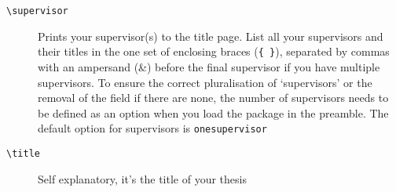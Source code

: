 \documentclass[12pt,oneside]{article}
\newcommand{\oporcom}[1]{\texttt{\color{RoyalBlue}#1}} %
\begin{document}
\begin{description}
    \item[\oporcom{\textbackslash{}supervisor}]
    Prints your supervisor(s) to the title page. List all your supervisors and their titles in the one set of enclosing braces (\texttt{\{ \}}), separated by commas with an ampersand (\&) before the final supervisor if you have multiple supervisors. To ensure the correct pluralisation of `supervisors' or the removal of the field if there are none, the number of supervisors needs to be defined as an option when you load the package in the preamble. The default option for supervisors is \oporcom{onesupervisor}
    
    \item[\oporcom{\textbackslash{}title}]
    Self explanatory, it's the title of your thesis
\end{description}
\end{document}
